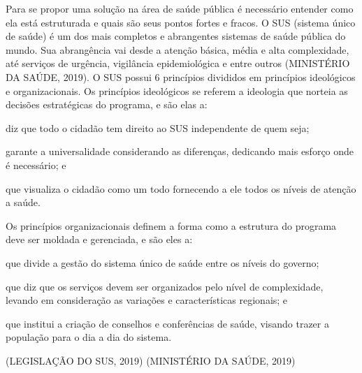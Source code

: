\documentclass[
	12pt,				%
	openright,			%
	oneside,			%
	a4paper,			%
	chapter=TITLE,		%
	section=TITLE,		%
	subsection=TITLE,	%
	subsubsection=TITLE,%
	english,			%
	brazil				%
	]{abntex2}
\theoremstyle{definition}
\begin{document}
    Para se propor uma solução na área de saúde pública é necessário entender como ela está estruturada e quais são seus pontos fortes e fracos. O SUS (sistema único de saúde) é um dos mais completos e abrangentes sistemas de saúde pública do mundo. Sua abrangência vai desde a atenção básica, média e alta complexidade, até serviços de urgência, vigilância epidemiológica e entre outros (MINISTÉRIO DA SAÚDE, 2019).
    O SUS possui 6 princípios divididos em princípios ideológicos e organizacionais. Os princípios ideológicos se referem a ideologia que norteia as decisões estratégicas do programa, e são elas a:
    \begin{description}[font=$\bullet$~\normalfont\scshape\color{black!50!black}]
    \item [Universalidade] diz que todo o cidadão tem direito ao SUS independente de quem seja;
    \item [Equidade] garante a universalidade considerando as diferenças, dedicando mais esforço onde é necessário; e 
    \item [Integridade] que visualiza o cidadão como um todo fornecendo a ele todos os níveis de atenção a saúde.
    \end{description}
    Os princípios organizacionais definem a forma como a estrutura do programa deve ser moldada e gerenciada, e são eles a:
    \begin{description}[font=$\bullet$~\normalfont\scshape\color{black!50!black}]
    \item [Descentralização] que divide a gestão do sistema único de saúde entre os níveis do governo;
    \item [Regionalização/Hierarquização] que diz que os serviços devem ser organizados pelo nível de complexidade, levando em consideração as variações e características regionais; e 
    \item [Participação Popular] que institui a criação de conselhos e conferências de saúde, visando trazer a população para o dia a dia do sistema.
    \end{description}
    (LEGISLAÇÃO DO SUS, 2019) (MINISTÉRIO DA SAÚDE, 2019) 
    
\end{document}
